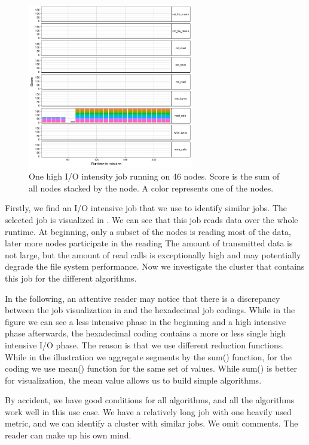 \documentclass[]{llncs}
\begin{document}
\begin{figure}[h]
  \centering
  \includegraphics[width=2.84in,height=2.85in]{./media/image1.png}
  \caption{One high I/O intensity job running on 46 nodes. Score is the sum of all nodes stacked by the node. A color represents one of the nodes.}
  \label{fig:use_case}
\end{figure}

Firstly, we find an I/O intensive job that we use to identify similar jobs.
The selected job is visualized in .
We can see that this job reads data over the whole runtime.
At beginning, only a subset of the nodes is reading most of the data, later more nodes participate in the reading The amount of transmitted data is not large, but the amount of read calls is exceptionally high and may potentially degrade the file system performance.
Now we investigate the cluster that contains this job for the different algorithms.

In the following, an attentive reader may notice that there is a discrepancy between the job visualization in   and the hexadecimal job codings.
While in the figure we can see a less intensive phase in the beginning and a high intensive phase afterwards, the hexadecimal coding contains a more or less single high intensive I/O phase.
The reason is that we use different reduction functions. While in the illustration we aggregate segments by the sum() function, for the coding we use mean() function for the same set of values.
While sum() is better for visualization, the mean value allows us to build simple algorithms.

By accident, we have good conditions for all algorithms, and all the algorithms work well in this use case.
We have a relatively long job with one heavily used metric, and we can identify a cluster with similar jobs.
We omit comments.
The reader can make up his own mind.
\end{document}
